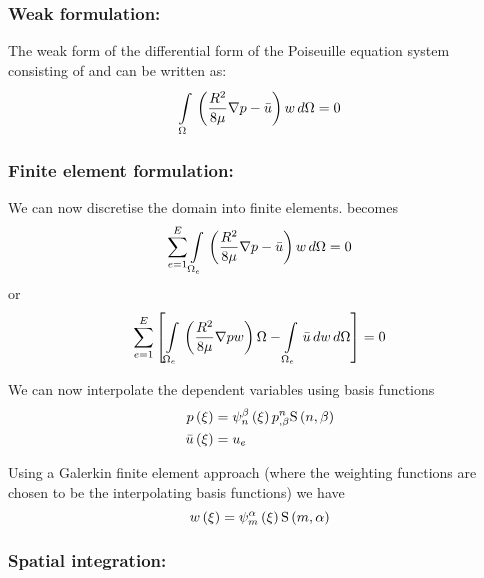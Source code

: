 \subsubsection{Weak formulation:}

The weak form of the differential form of the Poiseuille equation system
consisting of  and can be written as:
\begin{equation}
  \gint{\Omega}{}{\pbrac{\dfrac{R^{2}}{8\mu}\gradient{}{p}-\bar{u}}w}{\Omega}=0
  \label{eqn:Poiseuilleweakform}
\end{equation}

\subsubsection{Finite element formulation:}
We can now discretise the domain into finite elements.  becomes
\begin{equation}
  \dsum_{e=1}^{E}\gint{\Omega_{e}}{}{\pbrac{\frac{R^{2}}{8\mu}\gradient{}{p}-\bar{u}}w}{\Omega}=0
  \label{eqn:Poiseullefemform1}
\end{equation}
or
\begin{equation}
  \dsum_{e=1}^{E}\sqbrac{\gint{\Omega_{e}}{}{\pbrac{\frac{R^{2}}{8\mu}\gradient{}{p}w}{\Omega}-\gint{\Omega_{e}}{}{\bar{u}}w}{\Omega}}=0
  \label{eqn:Poiseullefemform2}
\end{equation}

We can now interpolate the dependent variables using basis functions
\begin{equation}
  \begin{split}
     p\left( \xi \right)  &=    \psi_{n}^{\beta} \left( \xi \right)    {p}^{n} _{,\beta}    \mathrm{S} \left( n,\beta \right)   \\
     \bar{u}\left( \xi \right)  &=  u_{e} 
  \end{split}
\end{equation}

Using a Galerkin finite element approach (where the weighting functions are
chosen to be the interpolating basis functions) we have 
\begin{equation}
   w\left( \xi \right) =   \psi_{m}^{\alpha} \left( \xi \right)     \mathrm{S} \left( m,\alpha \right)  
\end{equation}

\subsubsection{Spatial integration:}

